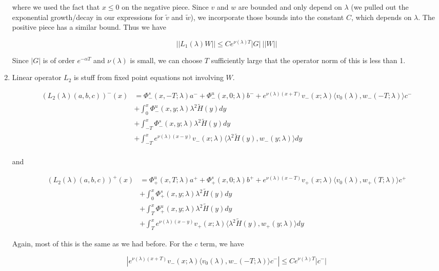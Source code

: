 \documentclass[12pt]{article}
\begin{document}
\begin{enumerate}
where we used the fact that $x \leq 0$ on the negative piece. Since $v$ and $w$ are bounded and only depend on $\lambda$ (we pulled out the exponential growth/decay in our expressions for $\tilde{v}$ and $\tilde{w}$), we incorporate those bounds into the constant $C$, which depends on $\lambda$. The positive piece has a similar bound. Thus we have

\[
||L_1(\lambda)W|| \leq C e^{\nu(\lambda)T} |G| \: ||W||
\]

Since $|G|$ is of order $e^{-\alpha T}$ and $\nu(\lambda)$ is small, we can choose $T$ sufficiently large that the operator norm of this is less than 1.

\item Linear operator $L_2$ is stuff from fixed point equations not involving $W$.

\begin{align*}
(L_2(\lambda)(a,b,c))^-(x) &= \Phi^s_-(x, -T; \lambda)a^- + \Phi^u_-(x, 0; \lambda)b^- + e^{\nu(\lambda)(x+T)} v_-(x; \lambda) \langle v_0(\lambda), w_-(-T; \lambda) \rangle c^- \\
&+ \int_0^x \Phi^u_-(x, y; \lambda) \lambda^2 \tilde{H}(y) dy \\
&+ \int_{-T}^x \Phi^s_-(x, y; \lambda) \lambda^2 \tilde{H}(y) dy \\
&+ \int_{-T}^x 
e^{\nu(\lambda)(x-y)} v_-(x; \lambda) \langle \lambda^2 \tilde{H}(y), w_-(y; \lambda) \rangle dy \\
\end{align*}

and

\begin{align*}
(L_2(\lambda)(a,b,c))^+(x) &= \Phi^u_+(x, T; \lambda)a^+ + \Phi^s_+(x, 0; \lambda)b^+ + e^{\nu(\lambda)(x - T)} v_+(x; \lambda) \langle v_0(\lambda), w_+(T; \lambda) \rangle c^+ \\
&+ \int_0^x \Phi^s_+(x, y; \lambda) \lambda^2 \tilde{H}(y) dy \\
&+ \int_T^x \Phi^u_+(x, y; \lambda) \lambda^2 \tilde{H}(y) dy \\
&+ \int_T^x e^{\nu(\lambda)(x-y)} v_+(x; \lambda) \langle \lambda^2 \tilde{H}(y), w_+(y; \lambda) \rangle dy
\end{align*}

Again, most of this is the same as we had before. For the $c$ term, we have 

\[
|e^{\nu(\lambda)(x+T)} v_-(x; \lambda) \langle v_0(\lambda), w_-(-T; \lambda) \rangle c^- | \leq C e^{\nu(\lambda)T}|c^-|
\]


\end{enumerate}
\end{document}
